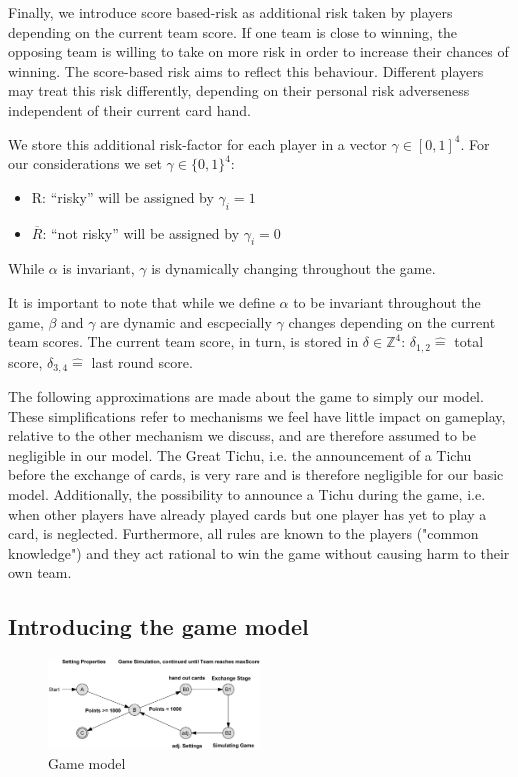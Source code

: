 Finally, we introduce score based-risk as additional risk taken by players depending on the current team score. If one team is close to winning, the opposing team is willing to take on more risk in order to increase their chances of winning. The score-based risk aims to reflect this behaviour. Different players may treat this risk differently, depending on their personal risk adverseness independent of their current card hand.

 We store this additional risk-factor for each player in a vector $\gamma \in [0,1]^4$. For our considerations we set  $\gamma \in \{0,1\}^4$: \\
\begin{itemize}
\item R: “risky” will be assigned by $\gamma_i = 1$
\item $\overline{R}$: “not risky” will be assigned by $\gamma_i = 0$ \\
\end{itemize}
While $\alpha$ is invariant, $\gamma$ is dynamically changing throughout the game. 

It is important to note that while we define $\alpha$ to be invariant throughout the game, $\beta$ and $\gamma$ are dynamic and escpecially $\gamma$ changes depending on the current team scores. The current team score, in turn, is stored in $\delta \in \mathbb{Z}^4$: $\delta_{1,2} \widehat{=}$ total score, $\delta_{3,4} \widehat{=}$ last round score.

The following approximations are made about the game to simply our model. These simplifications refer to mechanisms we feel have little impact on gameplay, relative to the other mechanism we discuss, and are therefore assumed to be negligible in our model. The Great Tichu, i.e. the announcement of a Tichu before the exchange of cards, is very rare and is therefore negligible for our basic model. Additionally, the possibility to announce a Tichu during the game, i.e. when other players have already played cards but one player has yet to play a card, is neglected. Furthermore, all rules are known to the players ("common knowledge") and they act rational to win the game without causing harm to their own team.

\subsection{Introducing the game model}

\begin{figure}[h]
    \centering
    \includegraphics[width=0.5\textwidth]{Bilder/graph}
    \caption{Game model}
    \label{fig:1}
\end{figure}

